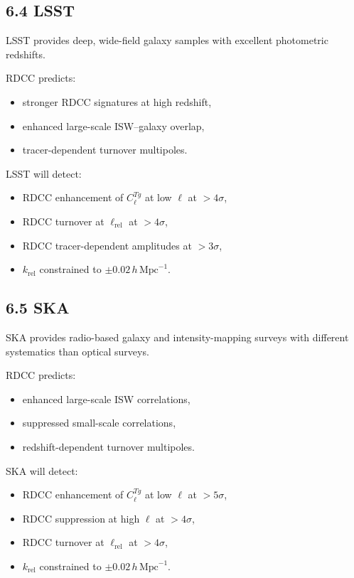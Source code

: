\documentclass[11pt,a4paper]{article}
\begin{document}
\subsection*{6.4 LSST}

LSST provides deep, wide-field galaxy samples with excellent photometric redshifts.

RDCC predicts:

\begin{itemize}
    \item stronger RDCC signatures at high redshift,
    \item enhanced large-scale ISW–galaxy overlap,
    \item tracer-dependent turnover multipoles.
\end{itemize}

LSST will detect:

\begin{itemize}
    \item RDCC enhancement of $C_{\ell}^{Tg}$ at low $\ell$ at $>4\sigma$,
    \item RDCC turnover at $\ell_{\mathrm{rel}}$ at $>4\sigma$,
    \item RDCC tracer-dependent amplitudes at $>3\sigma$,
    \item $k_{\mathrm{rel}}$ constrained to $\pm 0.02\,h\,\mathrm{Mpc}^{-1}$.
\end{itemize}

\subsection*{6.5 SKA}

SKA provides radio-based galaxy and intensity-mapping surveys with different systematics than 
optical surveys.

RDCC predicts:

\begin{itemize}
    \item enhanced large-scale ISW correlations,
    \item suppressed small-scale correlations,
    \item redshift-dependent turnover multipoles.
\end{itemize}

SKA will detect:

\begin{itemize}
    \item RDCC enhancement of $C_{\ell}^{Tg}$ at low $\ell$ at $>5\sigma$,
    \item RDCC suppression at high $\ell$ at $>4\sigma$,
    \item RDCC turnover at $\ell_{\mathrm{rel}}$ at $>4\sigma$,
    \item $k_{\mathrm{rel}}$ constrained to $\pm 0.02\,h\,\mathrm{Mpc}^{-1}$.
\end{itemize}
\end{document}
